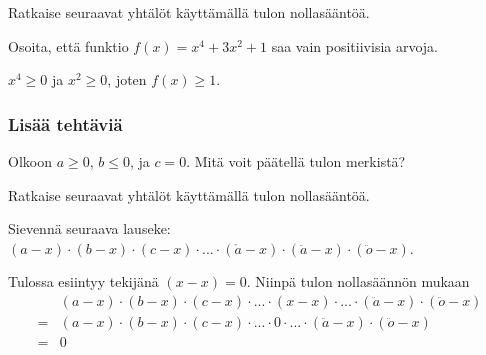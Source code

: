 \begin{tehtavasivu}
\begin{tehtava}
    Ratkaise seuraavat yhtälöt käyttämällä tulon nollasääntöä.
    \begin{vastaus}
    \end{vastaus}
\end{tehtava}

\begin{tehtava} 
Osoita, että funktio $f(x)=x^4+3x^2+1$ saa vain positiivisia arvoja.
    \begin{vastaus}
     $x^4\geq 0$ ja $x^2 \geq 0$, joten $f(x) \geq 1$.
    \end{vastaus}
\end{tehtava}

\subsubsection*{Lisää tehtäviä}

\begin{tehtava}
	Olkoon $a \geq 0$, $b \leq 0$, ja $c=0$. Mitä voit päätellä tulon merkistä?
	\begin{vastaus}
	\end{vastaus}
\end{tehtava}

\begin{tehtava}
    Ratkaise seuraavat yhtälöt käyttämällä tulon nollasääntöä.
    \begin{vastaus}
    \end{vastaus}
\end{tehtava}

\begin{tehtava}
    Sievennä seuraava lauseke: $(a-x)\cdot(b-x)\cdot(c-x)\cdot...\cdot(\mathring{a}-x)\cdot(\ddot{a}-x)\cdot(\ddot{o}-x)$.
    \begin{vastaus}
        Tulossa esiintyy tekijänä $(x-x)=0$. Niinpä tulon nollasäännön mukaan
        \begin{align*}
            &(a-x)\cdot(b-x)\cdot(c-x)\cdot...\cdot(x-x)\cdot...\cdot(\ddot{a}-x)\cdot(\ddot{o}-x) \\
            =&(a-x)\cdot(b-x)\cdot(c-x)\cdot...\cdot 0\cdot...\cdot(\ddot{a}-x)\cdot(\ddot{o}-x) \\
            =&0
        \end{align*}
    \end{vastaus}
\end{tehtava}


\end{tehtavasivu}
